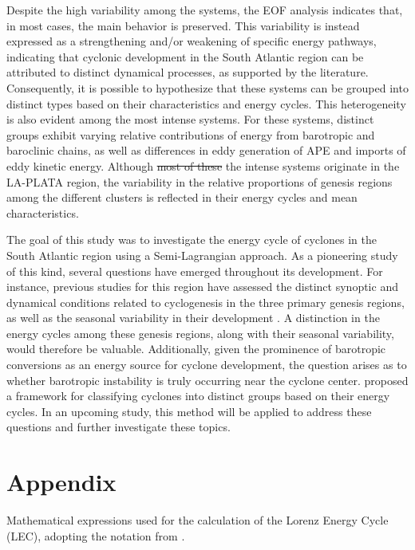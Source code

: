 \documentclass[pdflatex,sn-chicago]{sn-jnl}%
\makeatletter
\theoremstyle{plain}
\theoremstyle{definition}
\theoremstyle{remark}
\theoremstyle{definition}
\providecommand{\DIFaddtex}[1]{{\protect\color{blue}#1}} %
\providecommand{\DIFdeltex}[1]{{\protect\color{red}\sout{#1}}} %
\providecommand{\DIFaddbegin}{} %
\providecommand{\DIFaddend}{} %
\providecommand{\DIFdelbegin}{} %
\providecommand{\DIFdelend}{} %
\providecommand{\DIFadd}[1]{\texorpdfstring{\DIFaddtex{#1}}{#1}} %
\providecommand{\DIFdel}[1]{\texorpdfstring{\DIFdeltex{#1}}{}} %
\let\sout@orig\sout %
\renewcommand{\sout}[1]{\ifmmode\text{\sout@orig{\ensuremath{#1}}}\else\sout@orig{#1}\fi} %
\makeatother
\begin{document}
Despite the high variability among the systems, the EOF analysis indicates that, in most cases, the main behavior is preserved. This variability is instead expressed as a strengthening and/or weakening of specific energy pathways, indicating that cyclonic development in the South Atlantic region can be attributed to distinct dynamical processes, as supported by the literature. Consequently, it is possible to hypothesize that these systems can be grouped into distinct types based on their characteristics and energy cycles. This heterogeneity is also evident among the most intense systems. For these systems, distinct groups exhibit varying relative contributions of energy from barotropic and baroclinic chains, as well as differences in eddy generation of APE and imports of eddy kinetic energy. Although \DIFdelbegin \DIFdel{most of these }\DIFdelend \DIFaddbegin \DIFadd{the }\DIFaddend intense systems originate in the LA-PLATA region, the variability in the relative proportions of genesis regions among the different clusters is reflected in their energy cycles and mean characteristics.

The goal of this study was to investigate the energy cycle of cyclones in the South Atlantic region using a Semi-Lagrangian approach. As a pioneering study of this kind, several questions have emerged throughout its development. For instance, previous studies for this region have assessed the distinct synoptic and dynamical conditions related to cyclogenesis in the three primary genesis regions, as well as the seasonal variability in their development \citep{gramcianinov2019properties, crespo2021potential}. A distinction in the energy cycles among these genesis regions, along with their seasonal variability, would therefore be valuable. Additionally, given the prominence of barotropic conversions as an energy source for cyclone development, the question arises as to whether barotropic instability is truly occurring near the cyclone center. \citet{souza2024thesis} proposed a framework for classifying cyclones into distinct groups based on their energy cycles. In an upcoming study, this method will be applied to address these questions and further investigate these topics.


\backmatter



\section*{Appendix}


Mathematical expressions used for the calculation of the Lorenz Energy Cycle (LEC), adopting the notation from \citet{michaelides1987limited}. 
\end{document}
